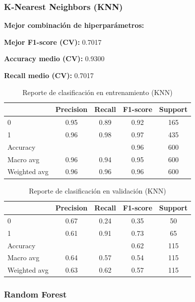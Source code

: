 \documentclass[conference]{IEEEtran}
\begin{document}

\subsubsection{K-Nearest Neighbors (KNN)}

\textbf{Mejor combinación de hiperparámetros:} 


\textbf{Mejor F1-score (CV):} 0.7017 

\textbf{Accuracy medio (CV):} 0.9300 

\textbf{Recall medio (CV):} 0.7017

\begin{table}[htbp]
\centering
\caption{Reporte de clasificación en entrenamiento (KNN)}
\begin{tabular}{lcccc}
\toprule
 & Precision & Recall & F1-score & Support \\
\midrule
0 & 0.95 & 0.89 & 0.92 & 165 \\
1 & 0.96 & 0.98 & 0.97 & 435 \\
\midrule
Accuracy & & & 0.96 & 600 \\
Macro avg & 0.96 & 0.94 & 0.95 & 600 \\
Weighted avg & 0.96 & 0.96 & 0.96 & 600 \\
\bottomrule
\end{tabular}
\label{tab:knn_train}
\end{table}

\begin{table}[htbp]
\centering
\caption{Reporte de clasificación en validación (KNN)}
\begin{tabular}{lcccc}
\toprule
 & Precision & Recall & F1-score & Support \\
\midrule
0 & 0.67 & 0.24 & 0.35 & 50 \\
1 & 0.61 & 0.91 & 0.73 & 65 \\
\midrule
Accuracy & & & 0.62 & 115 \\
Macro avg & 0.64 & 0.57 & 0.54 & 115 \\
Weighted avg & 0.63 & 0.62 & 0.57 & 115 \\
\bottomrule
\end{tabular}
\label{tab:knn_val}
\end{table}


\subsubsection{Random Forest}
\end{document}
